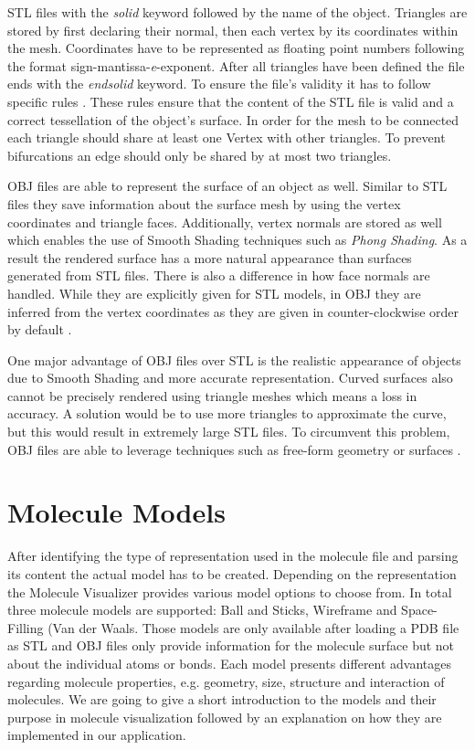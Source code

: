 STL files with the \textit{solid} keyword followed by the name of the object. Triangles are stored by first declaring their normal, then each vertex by its coordinates within the mesh. Coordinates have to be represented as floating point numbers following the format sign-mantissa-\textit{e}-exponent. After all triangles have been defined the file ends with the \textit{endsolid} keyword. To ensure the file's validity it has to follow specific rules \cite{HAMANN1994197}. These rules ensure that the content of the STL file is valid and a correct tessellation of the object's surface. In order for the mesh to be connected each triangle should share at least one Vertex with other triangles. To prevent bifurcations an edge should only be shared by at most two triangles. 

OBJ files are able to represent the surface of an object as well. Similar to STL files they save information about the surface mesh by using the vertex coordinates and triangle faces. Additionally, vertex normals are stored as well which enables the use of Smooth Shading techniques such as \textit{Phong Shading}. As a result the rendered surface has a more natural appearance than surfaces generated from STL files. There is also a difference in how face normals are handled. While they are explicitly given for STL models, in OBJ they are inferred from the vertex coordinates as they are given in counter-clockwise order by default \cite{Iqbal2019Sep}.

One major advantage of OBJ files over STL is the realistic appearance of objects due to Smooth Shading and more accurate representation. Curved surfaces also cannot be precisely rendered using triangle meshes which means a loss in accuracy. A solution would be to use more triangles to approximate the curve, but this would result in extremely large STL files. To circumvent this problem, OBJ files are able to leverage techniques such as free-form geometry or surfaces \cite{Iqbal2019Sep}. 

\section{Molecule Models}
\label{sec:implementation:molmodels}

After identifying the type of representation used in the molecule file and parsing its content the actual model has to be created. Depending on the representation the Molecule Visualizer provides various model options to choose from. In total three molecule models are supported: Ball and Sticks, Wireframe and Space-Filling (Van der Waals. Those models are only available after loading a PDB file as STL and OBJ files only provide information for the molecule surface but not about the individual atoms or bonds. Each model presents different advantages regarding molecule properties, e.g. geometry, size, structure and interaction of molecules. We are going to give a short introduction to the models and their purpose in molecule visualization followed by an explanation on how they are implemented in our application.

